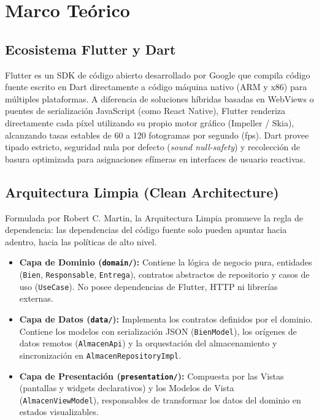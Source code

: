 \documentclass[12pt,a4paper]{article}
\begin{document}
\section{Marco Teórico}

\subsection{Ecosistema Flutter y Dart}
Flutter es un SDK de código abierto desarrollado por Google que compila código fuente escrito en Dart directamente a código máquina nativo (ARM y x86) para múltiples plataformas. A diferencia de soluciones híbridas basadas en WebViews o puentes de serialización JavaScript (como React Native), Flutter renderiza directamente cada píxel utilizando su propio motor gráfico (Impeller / Skia), alcanzando tasas estables de 60 a 120 fotogramas por segundo (fps). Dart provee tipado estricto, seguridad nula por defecto (\textit{sound null-safety}) y recolección de basura optimizada para asignaciones efímeras en interfaces de usuario reactivas.

\subsection{Arquitectura Limpia (Clean Architecture)}
Formulada por Robert C. Martin, la Arquitectura Limpia promueve la regla de dependencia: las dependencias del código fuente solo pueden apuntar hacia adentro, hacia las políticas de alto nivel.
\begin{itemize}
    \item \textbf{Capa de Dominio (\texttt{domain/}):} Contiene la lógica de negocio pura, entidades (\texttt{Bien}, \texttt{Responsable}, \texttt{Entrega}), contratos abstractos de repositorio y casos de uso (\texttt{UseCase}). No posee dependencias de Flutter, HTTP ni librerías externas.
    \item \textbf{Capa de Datos (\texttt{data/}):} Implementa los contratos definidos por el dominio. Contiene los modelos con serialización JSON (\texttt{BienModel}), los orígenes de datos remotos (\texttt{AlmacenApi}) y la orquestación del almacenamiento y sincronización en \texttt{AlmacenRepositoryImpl}.
    \item \textbf{Capa de Presentación (\texttt{presentation/}):} Compuesta por las Vistas (pantallas y widgets declarativos) y los Modelos de Vista (\texttt{AlmacenViewModel}), responsables de transformar los datos del dominio en estados visualizables.
\end{itemize}
\end{document}
